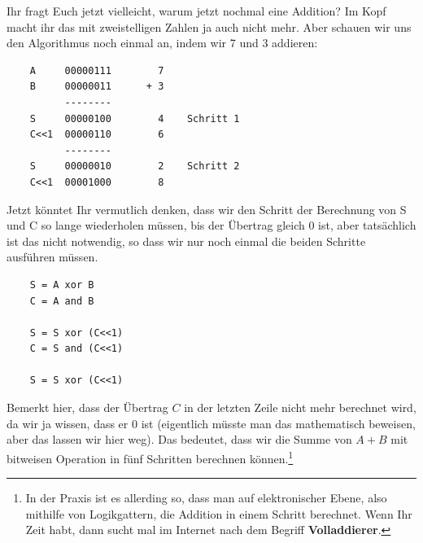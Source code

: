       Ihr fragt Euch jetzt vielleicht, warum jetzt nochmal eine Addition? Im Kopf macht ihr das mit zweistelligen Zahlen ja auch nicht mehr. Aber schauen wir uns den Algorithmus noch einmal an, indem wir 7 und 3 addieren:
\begin{lstlisting}
    A     00000111        7
    B     00000011      + 3
          --------
    S     00000100        4    Schritt 1
    C<<1  00000110        6
          --------
    S     00000010        2    Schritt 2
    C<<1  00001000        8
\end{lstlisting}
      Jetzt könntet Ihr vermutlich denken, dass wir den Schritt der Berechnung von S und C so lange wiederholen müssen, bis der Übertrag gleich 0 ist, aber tatsächlich ist das nicht notwendig, so dass wir nur noch einmal die beiden Schritte ausführen müssen.
\begin{verbatim}
    S = A xor B
    C = A and B

    S = S xor (C<<1)
    C = S and (C<<1)

    S = S xor (C<<1)
\end{verbatim}
      Bemerkt hier, dass der Übertrag $C$ in der letzten Zeile nicht mehr berechnet wird, da wir ja wissen, dass er 0 ist (eigentlich müsste man das mathematisch beweisen, aber das lassen wir hier weg). Das bedeutet, dass wir die Summe von $A+B$ mit bitweisen Operation in fünf Schritten berechnen können.\footnote{%
        In der Praxis ist es allerding so, dass man auf elektronischer Ebene, also mithilfe von Logikgattern, die Addition in einem Schritt berechnet. Wenn Ihr Zeit habt, dann sucht mal im Internet nach dem Begriff \textbf{Volladdierer}.}
